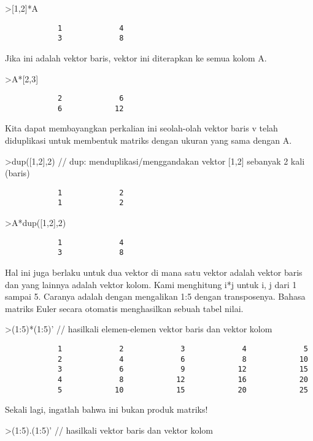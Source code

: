 \documentclass[
]{book}
\begin{document}
\textgreater{[}1,2{]}*A

\begin{verbatim}
            1             4 
            3             8 
\end{verbatim}

Jika ini adalah vektor baris, vektor ini diterapkan ke semua kolom A.

\textgreater A*{[}2,3{]}

\begin{verbatim}
            2             6 
            6            12 
\end{verbatim}

Kita dapat membayangkan perkalian ini seolah-olah vektor baris v telah diduplikasi untuk membentuk matriks dengan ukuran yang sama dengan A.

\textgreater dup({[}1,2{]},2) // dup: menduplikasi/menggandakan vektor {[}1,2{]} sebanyak 2 kali (baris)

\begin{verbatim}
            1             2 
            1             2 
\end{verbatim}

\textgreater A*dup({[}1,2{]},2)

\begin{verbatim}
            1             4 
            3             8 
\end{verbatim}

Hal ini juga berlaku untuk dua vektor di mana satu vektor adalah vektor baris dan yang lainnya adalah vektor kolom. Kami menghitung i*j untuk i, j dari 1 sampai 5. Caranya adalah dengan mengalikan 1:5 dengan transposenya. Bahasa matriks Euler secara otomatis menghasilkan sebuah tabel nilai.

\textgreater(1:5)*(1:5)' // hasilkali elemen-elemen vektor baris dan vektor kolom

\begin{verbatim}
            1             2             3             4             5 
            2             4             6             8            10 
            3             6             9            12            15 
            4             8            12            16            20 
            5            10            15            20            25 
\end{verbatim}

Sekali lagi, ingatlah bahwa ini bukan produk matriks!

\textgreater(1:5).(1:5)' // hasilkali vektor baris dan vektor kolom
\end{document}
